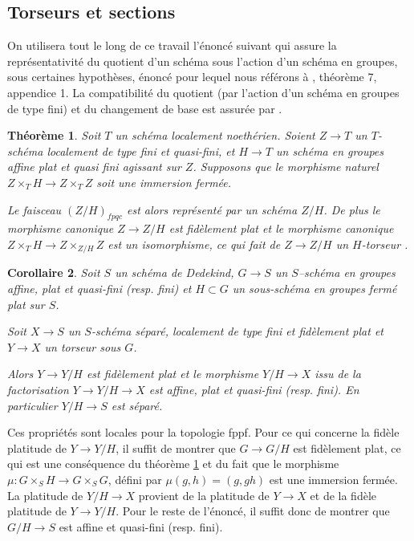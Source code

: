 \documentclass[11pt]{amsart}
\numberwithin{equation}{section}
\newtheorem{thm}{Th\'eor\`eme}[section]
\newtheorem{cor}[thm]{Corollaire}
\theoremstyle{definition}
\theoremstyle{remark}
\begin{document}
\subsection{Torseurs et sections}
\label{Preliminaires}

On utilisera tout le long de ce travail l'\'enonc\'e suivant qui assure la repr\'esentativit\'e du quotient d'un sch\'ema sous l'action d'un sch\'ema en groupes, sous certaines hypoth\`eses, \'enonc\'e pour lequel nous r\'ef\'erons \`a
\cite{Ana}, th\'eor\`eme 7, appendice 1. La compatibilit\'e du quotient (par l'action d'un sch\'ema en groupes de type fini) et du changement de base est assur\'ee par \cite[Expos\'e IV, 3.4.3.1]{SGA}.


\begin{thm}\label{teoQuozReno}
Soit $T$ un sch\'ema localement noeth\'erien. Soient $Z\to T$ un $T$-sch\'ema localement de type fini et quasi-fini, et $H\to T$ un sch\'ema en groupes affine plat  et quasi fini agissant sur $Z$.  Supposons que le morphisme naturel $Z\times_T H\to Z\times_T Z$ soit une immersion ferm\'ee.

Le faisceau $(Z/H)_{fpqc}$ est alors repr\'esent\'e par un sch\'ema $Z/H$.  De plus le morphisme canonique $Z\to Z/H$ est fid\`element plat et le morphisme canonique $Z \times _T H \to Z\times _{Z/H} Z $ est un isomorphisme, ce qui fait de $Z \to Z/H$ un $H$-torseur .
\end{thm}

\begin{cor}\label{quotient-de-torseur} Soit $S$ un sch\'ema de Dedekind, $G\to S$ un $S$--sch\'ema en groupes affine, plat et quasi-fini (resp. fini) et $H\subset G$ un sous-sch\'ema en groupes ferm\'e plat sur $S$.

Soit $X \to S$ un $S$-sch\'ema s\'epar\'e, localement de type fini et fid\`element plat et $Y \to X$ un torseur sous $G$.

Alors $Y \to Y/H$ est fid\`element plat et le morphisme $Y/H \to X$ issu de la factorisation $Y \to Y/H \to X$ est affine, plat et quasi-fini (resp. fini). En particulier $Y/H \to S$ est s\'epar\'e. \end{cor}


\proof Ces propri\'et\'es sont locales pour la topologie fppf. Pour ce qui concerne la fid\`ele platitude de $Y \to Y/H$, il suffit de montrer que $G \to G/H$ est fid\`element plat, ce qui est une cons\'equence du th\'eor\`eme \ref{teoQuozReno} et du fait que le morphisme $\mu : G\times _SH \to G\times _S G$, d\'efini par $\mu (g,h)=(g, gh)$ est une immersion ferm\'ee. La platitude de $Y/H \to X$ provient de la platitude de $Y \to X$ et de la fid\`ele platitude de $Y \to Y/H$. Pour le reste de l'\'enonc\'e, il suffit donc de montrer que $G/H \to S$ est affine et quasi-fini (resp. fini).
\end{document}
